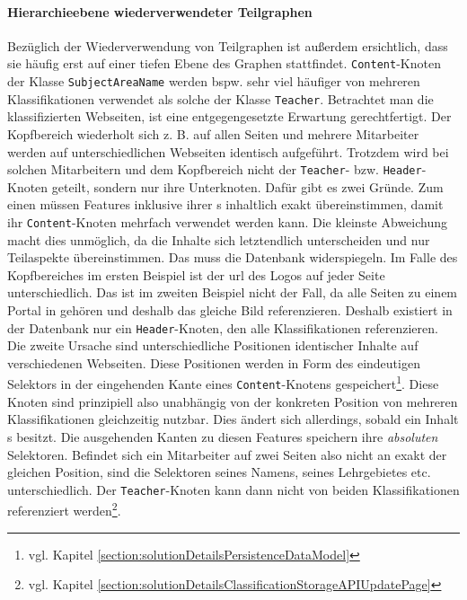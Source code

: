     \paragraph{Hierarchieebene wiederverwendeter Teilgraphen}
    Bezüglich der Wiederverwendung von Teilgraphen ist außerdem ersichtlich,
    dass sie häufig erst auf einer tiefen Ebene des Graphen stattfindet.
    \texttt{Content}-Knoten der Klasse \texttt{SubjectAreaName} werden bspw.
    sehr viel häufiger von mehreren Klassifikationen verwendet als solche der
    Klasse \texttt{Teacher}.
    Betrachtet man die klassifizierten Webseiten,
    ist eine entgegengesetzte Erwartung gerechtfertigt.
    Der Kopfbereich wiederholt sich z. B. auf allen Seiten
    und mehrere Mitarbeiter werden auf unterschiedlichen Webseiten identisch aufgeführt.
    Trotzdem wird bei solchen Mitarbeitern und dem Kopfbereich
    nicht der \texttt{Teacher}- bzw. \texttt{Header}-Knoten geteilt,
    sondern nur ihre Unterknoten.
    Dafür gibt es zwei Gründe.
    Zum einen müssen Features inklusive ihrer {\childFeature}s inhaltlich
    exakt übereinstimmen, damit ihr \texttt{Content}-Knoten mehrfach verwendet werden kann.
    Die kleinste Abweichung macht dies unmöglich,
    da die Inhalte sich letztendlich unterscheiden und nur Teilaspekte übereinstimmen.
    Das muss die Datenbank widerspiegeln.
    Im Falle des Kopfbereiches im ersten Beispiel ist der \gls{url} des Logos
    auf jeder Seite unterschiedlich.
    Das ist im zweiten Beispiel nicht der Fall,
    da alle Seiten zu einem Portal in {\wordpress} gehören
    und deshalb das gleiche Bild referenzieren.
    Deshalb existiert in der Datenbank nur ein \texttt{Header}-Knoten,
    den alle Klassifikationen referenzieren.
    Die zweite Ursache sind unterschiedliche Positionen identischer Inhalte
    auf verschiedenen Webseiten.
    Diese Positionen werden in Form des eindeutigen Selektors in der eingehenden
    Kante eines \texttt{Content}-Knotens gespeichert\footnote{vgl. Kapitel \ref{section:solutionDetailsPersistenceDataModel}}.
    Diese Knoten sind prinzipiell also unabhängig von der konkreten Position
    von mehreren Klassifikationen gleichzeitig nutzbar.
    Dies ändert sich allerdings, sobald ein Inhalt {\childFeature}s besitzt.
    Die ausgehenden Kanten zu diesen Features speichern ihre \textit{absoluten} Selektoren.
    Befindet sich ein Mitarbeiter auf zwei Seiten also nicht an exakt der gleichen Position,
    sind die Selektoren seines Namens, seines Lehrgebietes etc. unterschiedlich.
    Der \texttt{Teacher}-Knoten kann dann nicht von beiden Klassifikationen referenziert
    werden\footnote{vgl. Kapitel \ref{section:solutionDetailsClassificationStorageAPIUpdatePage}}.
    
